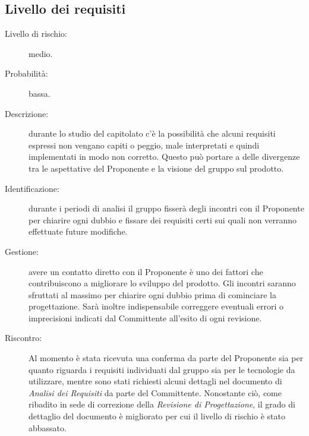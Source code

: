 \subsection{Livello dei requisiti}
\begin{description}
	\item[Livello di rischio:] medio.
	\item[Probabilità:] bassa.
	\item[Descrizione:] durante lo studio del capitolato c'è la possibilità che alcuni requisiti espressi non vengano capiti o peggio, male interpretati e quindi implementati in modo non corretto. Questo può portare a delle divergenze tra le aspettative del Proponente e la visione del gruppo sul prodotto. 
	\item[Identificazione:] durante i periodi di analisi il gruppo fisserà degli incontri con il Proponente per chiarire ogni dubbio e fissare dei requisiti certi sui quali non verranno effettuate future modifiche.
	\item[Gestione:] avere un contatto diretto con il Proponente è uno dei fattori che contribuiscono a migliorare lo sviluppo del prodotto. Gli incontri saranno sfruttati al massimo per chiarire ogni dubbio prima di cominciare la progettazione. Sarà inoltre indispensabile correggere eventuali errori o imprecisioni indicati dal Committente all'esito di ogni revisione.
	\item[Riscontro:] Al momento è stata ricevuta una conferma da parte del Proponente sia per quanto riguarda i requisiti individuati dal gruppo sia per le tecnologie da utilizzare, mentre sono stati richiesti alcuni dettagli nel documento di \textit{Analisi dei Requisiti} da parte del Committente. Nonostante ciò, come ribadito in sede di correzione della \textit{Revisione di Progettazione}, il grado di dettaglio del documento è migliorato per cui il livello di rischio è stato abbassato.
\end{description}

